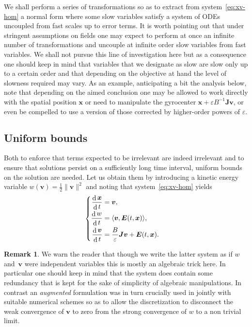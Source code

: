 \documentclass[10pt]{amsart}
\newenvironment{splitcases}
{\begin{cases}\begin{aligned}}
{\end{aligned}\end{cases}}
\let\eps\varepsilon
\DeclareMathOperator\dD{d}\let\dd\dD
\theoremstyle{plain}
\theoremstyle{definition}
\newtheorem{remark}[theorem]{Remark}
\newcommand\br{\begin{remark}}
\newcommand\er{\end{remark}}
\newcommand\bE{{\boldsymbol E}}
\newcommand\bJ{{\boldsymbol J}}
\newcommand\bfv{{\boldsymbol v}}
\newcommand\bfx{{\boldsymbol x}}
\let\e w
\begin{document}
We shall perform a series of transformations so as to extract from system~\eqref{eq:xv-hom} a normal form where some slow variables satisfy a system of ODEs uncoupled from fast scales up to error terms. It is worth pointing out that under stringent assumptions on fields one may expect to perform at once an infinite number of transformations and uncouple at infinite order slow variables from fast variables. We shall not pursue this line of investigation here but as a consequence one should keep in mind that variables that we designate as slow are slow only up to a certain order and that depending on the objective at hand the level of slowness required may vary. As an example, anticipating a bit the analysis below, note that depending on the aimed conclusion one may be allowed to work directly with the spatial position $\bfx$ or need to manipulate the gyrocenter $\bfx+\eps B^{-1}\bJ\bfv$, or even be compelled to use a version of those corrected by higher-order powers of $\eps$.

\subsection{Uniform bounds}

Both to enforce that terms expected to be irrelevant are indeed
irrelevant and to ensure that solutions persist on a sufficiently long
time interval, uniform bounds on the solution are needed. Let us
obtain them by introducing a kinetic energy variable $\e(\bfv) =\tfrac12\|\bfv\|^2$ and noting that system~\eqref{eq:xv-hom} yields
\[
\begin{splitcases}
\frac{\dD\bfx}{\dD t}&=\bfv,
\\
\frac{\dD \e}{\dD t}&=
\langle\bfv,\bE(t,\bfx)\rangle,
\\
\frac{\dD\bfv}{\dD t}&=\frac{B}{\eps}\bJ\bfv+\bE(t,\bfx).
\end{splitcases}
\]

\br\label{rddnt-hom}
We warn the reader that though we write the latter system as if $\e$ and~$\bfv$ were independent variables this is mostly an algebraic trick here. In particular one should keep in mind that the system does contain some redundancy that is kept for the sake of simplicity of algebraic manipulations. In contrast an \emph{augmented} formulation was in turn crucially used in \cite{FR2} jointly with suitable numerical schemes so as to allow the discretization to disconnect the weak convergence of $\bfv$ to zero from the strong convergence of $\e$ to a non trivial limit.
\er
\end{document}
